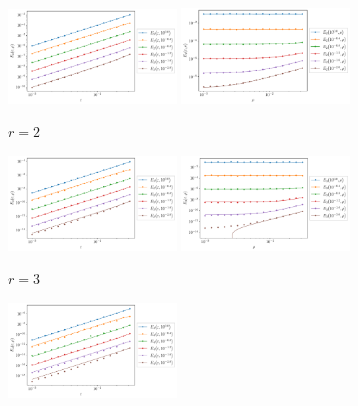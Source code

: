 \begin{figure}
	\begin{center}
		\begin{subfigure}{\textwidth}
			\includegraphics[width=0.49\textwidth]{chp04_paper_numerics/figures/multiplicative/str_err_eps_r_2.0_log.pdf}
			\includegraphics[width=0.49\textwidth]{chp04_paper_numerics/figures/multiplicative/str_err_rho_r_2.0_log.pdf}
			\caption{\(r = 2\)}
		\end{subfigure}
		\begin{subfigure}{\textwidth}
			\includegraphics[width=0.49\textwidth]{chp04_paper_numerics/figures/multiplicative/str_err_eps_r_3.0_log.pdf}
			\includegraphics[width=0.49\textwidth]{chp04_paper_numerics/figures/multiplicative/str_err_rho_r_3.0_log.pdf}
			\caption{\(r = 3\)}
		\end{subfigure}
		\begin{subfigure}{\textwidth}
			\includegraphics[width=0.49\textwidth]{chp04_paper_numerics/figures/multiplicative/str_err_eps_r_4.0_log.pdf}

\end{subfigure}
\end{center}
\end{figure}
